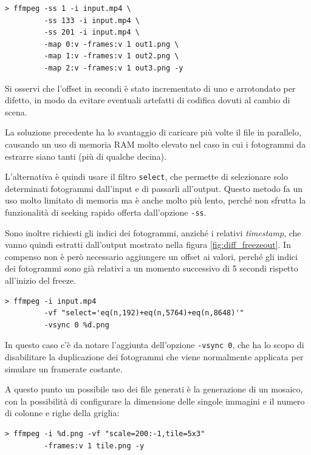 \begin{verbatim}
> ffmpeg -ss 1 -i input.mp4 \
         -ss 133 -i input.mp4 \
         -ss 201 -i input.mp4 \
         -map 0:v -frames:v 1 out1.png \
         -map 1:v -frames:v 1 out2.png \
         -map 2:v -frames:v 1 out3.png -y
\end{verbatim}

Si osservi che l'offset in secondi è stato incrementato di uno e arrotondato per difetto, in modo da evitare eventuali artefatti di codifica dovuti al cambio di scena.

La soluzione precedente ha lo svantaggio di caricare più volte il file in parallelo, causando un uso di memoria RAM molto elevato nel caso in cui i fotogrammi da estrarre siano tanti (più di qualche decina).

L'alternativa è quindi usare il filtro \texttt{select}, che permette di selezionare solo determinati fotogrammi dall'input e di passarli all'output. Questo metodo fa un uso molto limitato di memoria ma è anche molto più lento, perché non sfrutta la funzionalità di seeking rapido offerta dall'opzione \texttt{-ss}.

Sono inoltre richiesti gli indici dei fotogrammi, anziché i relativi \emph{timestamp}, che vanno quindi estratti dall'output mostrato nella figura \ref{fig:diff_freezeout}. In compenso non è però necessario aggiungere un offset ai valori, perché gli indici dei fotogrammi sono già relativi a un momento successivo di 5 secondi rispetto all'inizio del freeze.

\begin{verbatim}
> ffmpeg -i input.mp4
         -vf "select='eq(n,192)+eq(n,5764)+eq(n,8648)'"
         -vsync 0 %d.png
\end{verbatim}

In questo caso c'è da notare l'aggiunta dell'opzione \texttt{-vsync 0}, che ha lo scopo di disabilitare la duplicazione dei fotogrammi che viene normalmente applicata per simulare un framerate costante.

A questo punto un possibile uso dei file generati è la generazione di un mosaico, con la possibilità di configurare la dimensione delle singole immagini e il numero di colonne e righe della griglia:

\begin{verbatim}
> ffmpeg -i %d.png -vf "scale=200:-1,tile=5x3"
         -frames:v 1 tile.png -y
\end{verbatim}

